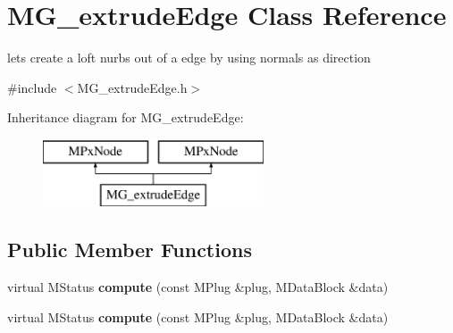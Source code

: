 \hypertarget{class_m_g__extrude_edge}{\section{M\-G\-\_\-extrude\-Edge Class Reference}
\label{class_m_g__extrude_edge}
}


lets create a loft nurbs out of a edge by using normals as direction  




{\ttfamily \#include $<$M\-G\-\_\-extrude\-Edge.\-h$>$}

Inheritance diagram for M\-G\-\_\-extrude\-Edge\-:\begin{figure}[H]
\begin{center}
\leavevmode
\includegraphics[height=2.000000cm]{class_m_g__extrude_edge}
\end{center}
\end{figure}
\subsection*{Public Member Functions}
\begin{DoxyCompactItemize}
\item 
\hypertarget{class_m_g__extrude_edge_a729d21cc69cb325f696629e858a17db8}{virtual M\-Status {\bfseries compute} (const M\-Plug \&plug, M\-Data\-Block \&data)}\label{class_m_g__extrude_edge_a729d21cc69cb325f696629e858a17db8}

\item 
\hypertarget{class_m_g__extrude_edge_a729d21cc69cb325f696629e858a17db8}{virtual M\-Status {\bfseries compute} (const M\-Plug \&plug, M\-Data\-Block \&data)}\label{class_m_g__extrude_edge_a729d21cc69cb325f696629e858a17db8}

\end{DoxyCompactItemize}
